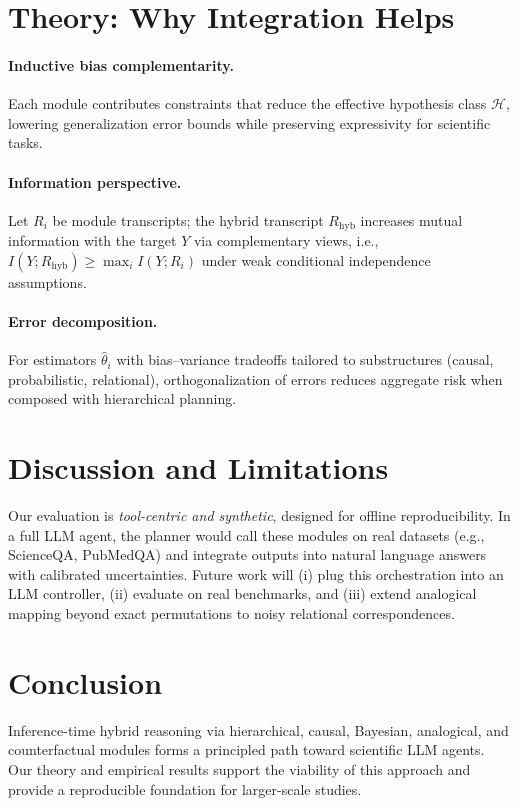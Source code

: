 \documentclass[11pt]{article}
\begin{document}
\section{Theory: Why Integration Helps}
\paragraph{Inductive bias complementarity.}
Each module contributes constraints that reduce the effective hypothesis class $\mathcal{H}$, lowering generalization error bounds while preserving expressivity for scientific tasks.
\paragraph{Information perspective.}
Let $R_i$ be module transcripts; the hybrid transcript $R_\mathrm{hyb}$ increases mutual information with the target $Y$ via complementary views, i.e., $I(Y;R_\mathrm{hyb}) \ge \max_i I(Y;R_i)$ under weak conditional independence assumptions.
\paragraph{Error decomposition.}
For estimators $\hat{\theta}_i$ with bias--variance tradeoffs tailored to substructures (causal, probabilistic, relational), orthogonalization of errors reduces aggregate risk when composed with hierarchical planning.

\section{Discussion and Limitations}
Our evaluation is \emph{tool-centric and synthetic}, designed for offline reproducibility. In a full LLM agent, the planner would call these modules on real datasets (e.g., ScienceQA, PubMedQA) and integrate outputs into natural language answers with calibrated uncertainties. Future work will (i) plug this orchestration into an LLM controller, (ii) evaluate on real benchmarks, and (iii) extend analogical mapping beyond exact permutations to noisy relational correspondences.

\section{Conclusion}
Inference-time hybrid reasoning via hierarchical, causal, Bayesian, analogical, and counterfactual modules forms a principled path toward scientific LLM agents. Our theory and empirical results support the viability of this approach and provide a reproducible foundation for larger-scale studies.



\end{document}
